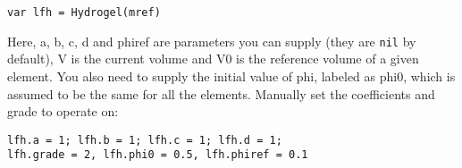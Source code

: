 \begin{lstlisting}
var lfh = Hydrogel(mref)
\end{lstlisting}

Here, a, b, c, d and phiref are parameters you can supply (they are
\texttt{nil} by default), V is the current volume and V0 is the
reference volume of a given element. You also need to supply the initial
value of phi, labeled as phi0, which is assumed to be the same for all
the elements. Manually set the coefficients and grade to operate on:

\begin{lstlisting}
lfh.a = 1; lfh.b = 1; lfh.c = 1; lfh.d = 1;
lfh.grade = 2, lfh.phi0 = 0.5, lfh.phiref = 0.1
\end{lstlisting}
